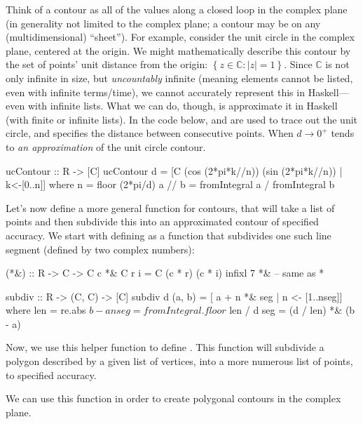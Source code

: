 Think of a contour as all of the values along a closed loop in the complex plane (in generality not limited to the complex plane; a contour may be on any (multidimensional) ``sheet''). For example, consider the unit circle in the complex plane, centered at the origin. We might mathematically describe this contour by the set of points' unit distance from the origin: $\left\{z\in\mathbb{C} : |z|=1\right\}$. 
Since $\mathbb{C}$ is not only infinite in size, but \textit{uncountably} infinite (meaning elements cannot be listed, even with infinite terms/time), we cannot accurately represent this in Haskell---even with infinite lists. What we can do, though, is approximate it in Haskell (with finite or infinite lists). In the code below,  and  are used to trace out the unit circle, and  specifies the distance between consecutive points. When $d\rightarrow0^+$  tends to \textit{an approximation} of the unit circle contour.
\begin{code}
ucContour :: R -> [C]
ucContour d = [C (cos (2*pi*k//n)) (sin (2*pi*k//n)) | k<-[0..n]] where
  n = floor (2*pi/d)
  a // b = fromIntegral a / fromIntegral b
\end{code}
Let's now define a more general function for contours, that will take a list of points and then subdivide this into an approximated contour of specified accuracy. We start with defining  as a function that subdivides one such line segment (defined by two complex numbers):
\begin{code}
(*&) :: R -> C -> C
c *& C r i = C (c * r) (c * i)
infixl 7 *& -- same as *

subdiv :: R -> (C, C) -> [C]
subdiv d (a, b) = [ a + n *& seg | n <- [1..nseg]] where
  len = re.abs $ b - a
  nseg = fromIntegral.floor $ len / d
  seg = (d / len) *& (b - a)
\end{code}
Now, we use this helper function to define . This function will subdivide a polygon described by a given list of vertices, into a more numerous list of points, to specified accuracy.

We can use this function in order to create polygonal contours in the complex plane. 

